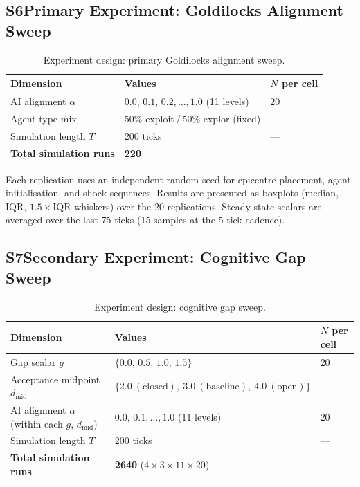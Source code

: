 \subsection*{S6\quad Primary Experiment: Goldilocks Alignment Sweep}

\begin{table}[h]
\centering
\caption{Experiment design: primary Goldilocks alignment sweep.}
\label{tab:S6}
\begin{tabular}{lll}
\toprule
Dimension & Values & $N$ per cell \\
\midrule
AI alignment $\alpha$
  & $0.0,\,0.1,\,0.2,\ldots,1.0$ (11 levels) & 20 \\
Agent type mix
  & 50\% exploit\,/\,50\% explor (fixed) & --- \\
Simulation length $T$
  & 200 ticks & --- \\
\midrule
\textbf{Total simulation runs} & \multicolumn{2}{l}{\textbf{220}} \\
\bottomrule
\end{tabular}
\end{table}

Each replication uses an independent random seed for epicentre placement, agent
initialisation, and shock sequences.
Results are presented as boxplots (median, IQR, $1.5\times$IQR whiskers) over the
20 replications.
Steady-state scalars are averaged over the last 75 ticks (15 samples at the
5-tick cadence).

\subsection*{S7\quad Secondary Experiment: Cognitive Gap Sweep}

\begin{table}[h]
\centering
\caption{Experiment design: cognitive gap sweep.}
\label{tab:S7}
\begin{tabular}{lll}
\toprule
Dimension & Values & $N$ per cell \\
\midrule
Gap scalar $g$               & $\{0.0,\,0.5,\,1.0,\,1.5\}$                   & 20 \\
Acceptance midpoint $d_{\mathrm{mid}}$ & $\{2.0\ (\text{closed}),\ 3.0\ (\text{baseline}),\ 4.0\ (\text{open})\}$ & --- \\
AI alignment $\alpha$ (within each $g$, $d_{\mathrm{mid}}$)
                             & $0.0,\,0.1,\ldots,1.0$ (11 levels)             & 20 \\
Simulation length $T$        & 200 ticks                                       & --- \\
\midrule
\textbf{Total simulation runs} & \multicolumn{2}{l}{\textbf{2640} ($4\times3\times11\times20$)} \\
\bottomrule
\end{tabular}
\end{table}

